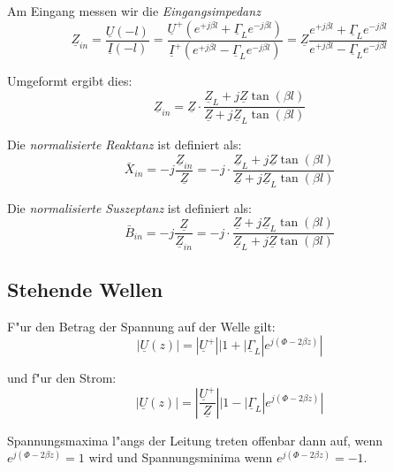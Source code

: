 \documentclass[german, 10pt, a4paper, headsepline]{scrreprt}
\theoremstyle{remark}
\begin{document}
Am Eingang messen wir die \textit{Eingangsimpedanz}
\begin{displaymath}
	\underline{Z}_{in} = \frac{\underline{U}(-l)}{\underline{I}(-l)} = \frac{\underline{U}^+ (e^{+j\beta l}+\underline{\Gamma}_L e^{-j\beta l})}{\underline{I}^+(e^{+j\beta l}- \underline{\Gamma}_L e^{-j\beta l})} = \underline{Z}\frac{e^{+j\beta l}+\underline{\Gamma}_L e^{-j\beta l}}{e^{+j\beta l}- \underline{\Gamma}_L e^{-j\beta l}}
\end{displaymath}

Umgeformt ergibt dies:
\begin{displaymath}
	\underline{Z}_{in} = \underline{Z} \cdotp \frac{\underline{Z}_L + j\underline{Z}\tan (\beta l)}{\underline{Z}+ j\underline{Z}_L \tan (\beta l)}
\end{displaymath}

Die \textit{normalisierte Reaktanz} ist definiert als:
\begin{displaymath}
	\bar{X}_{in} = -j\frac{\underline{Z}_{in}}{\underline{Z}} = -j\cdotp \frac{\underline{Z}_L+j\underline{Z}\tan (\beta l)}{\underline{Z}+j\underline{Z}_L \tan(\beta l)}
\end{displaymath}

Die \textit{normalisierte Suszeptanz} ist definiert als:
\begin{displaymath}
	\bar{B}_{in} = -j\frac{\underline{Z}}{\underline{Z}_{in}} = -j\cdotp \frac{\underline{Z}+j\underline{Z}_L \tan(\beta l)}{\underline{Z}_L+j\underline{Z}\tan (\beta l)}
\end{displaymath}

\subsection{Stehende Wellen}

F"ur den Betrag der Spannung auf der Welle gilt:
\begin{displaymath}
	|\underline{U}(z)| = | \underline{U}^+||1 + |\underline{\Gamma}_L|e^{j(\Phi-2\beta z)}|
\end{displaymath}

und f"ur den Strom:
\begin{displaymath}
	|\underline{U}(z)| = | \frac{\underline{U}^+}{\underline{Z}} ||1 - |\underline{\Gamma}_L|e^{j(\Phi-2\beta z)}|
\end{displaymath}

Spannungsmaxima l"angs der Leitung treten offenbar dann auf, wenn $e^{j(\Phi - 2\beta z)}=1$ wird und Spannungsminima wenn $e^{j(\Phi - 2\beta z)}=-1$.\\
\end{document}
